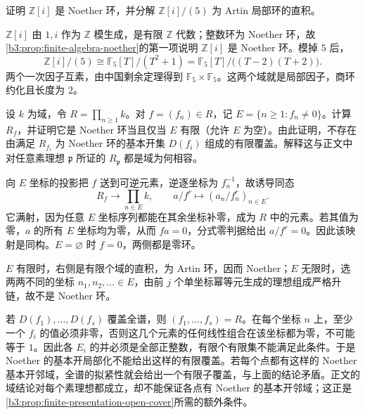 \begin{exercise}\label{b3:ex:03-finite-gaussian-algebra}
	证明 \(\mathbb Z[i]\) 是 Noether 环，并分解 \(\mathbb Z[i]/(5)\) 为 Artin 局部环的直积。
\end{exercise}
\begin{solution}
	\(\mathbb Z[i]\) 由 \(1,i\) 作为 \(\mathbb Z\) 模生成，是有限 \(\mathbb Z\) 代数；整数环为 Noether 环，故\cref{b3:prop:finite-algebra-noether}的第一项说明 \(\mathbb Z[i]\) 是 Noether 环。模掉 \(5\) 后，
	\[
		\mathbb Z[i]/(5)\cong\mathbb F_5[T]/(T^2+1) =\mathbb F_5[T]/\bigl((T-2)(T+2)\bigr).
	\]
	两个一次因子互素，由中国剩余定理得到 \(\mathbb F_5\times\mathbb F_5\)。这两个域就是局部因子，商环约化且长度为 \(2\)。
\end{solution}

\begin{exercise}\label{b3:ex:03-pointwise-noether}
	设 \(k\) 为域，令 \(R=\prod_{n\ge1}k\)。对 \(f=(f_n)\in R\)，记 \(E=\{n\ge1:f_n\ne0\}\)。计算 \(R_f\)，并证明它是 Noether 环当且仅当 \(E\) 有限（允许 \(E\) 为空）。由此证明，不存在由满足 \(R_{f_i}\) 为 Noether 环的基本开集 \(D(f_i)\) 组成的有限覆盖。解释这与正文中对任意素理想 \(\mathfrak p\) 所证的 \(R_{\mathfrak p}\) 都是域为何相容。
\end{exercise}
\begin{solution}
	向 \(E\) 坐标的投影把 \(f\) 送到可逆元素，逆逐坐标为 \(f_n^{-1}\)，故诱导同态
	\[
		R_f\longrightarrow\prod_{n\in E}k,\qquad a/f^r\longmapsto(a_n/f_n^r)_{n\in E}.
	\]
	它满射，因为任意 \(E\) 坐标序列都能在其余坐标补零，成为 \(R\) 中的元素。若其值为零，\(a\) 的所有 \(E\) 坐标均为零，从而 \(fa=0\)，分式零判据给出 \(a/f^r=0\)。因此该映射是同构。\(E=\varnothing\) 时 \(f=0\)，两侧都是零环。

	\(E\) 有限时，右侧是有限个域的直积，为 Artin 环，因而 Noether；\(E\) 无限时，选两两不同的坐标 \(n_1,n_2,\ldots\in E\)，由前 \(j\) 个单坐标幂等元生成的理想组成严格升链，故不是 Noether 环。

	若 \(D(f_1),\ldots,D(f_s)\) 覆盖全谱，则 \((f_1,\ldots,f_s)=R\)。在每个坐标 \(n\) 上，至少一个 \(f_i\) 的值必须非零，否则这几个元素的任何线性组合在该坐标都为零，不可能等于 \(1\)。因此各 \(E_i\) 的并必须是全部正整数，有限个有限集不能满足此条件。于是 Noether 的基本开局部化不能给出这样的有限覆盖。若每个点都有这样的 Noether 基本开邻域，全谱的拟紧性就会给出一个有限子覆盖，与上面的结论矛盾。正文的域结论对每个素理想都成立，却不能保证各点有 Noether 的基本开邻域；这正是\cref{b3:prop:finite-presentation-open-cover}所需的额外条件。
\end{solution}

